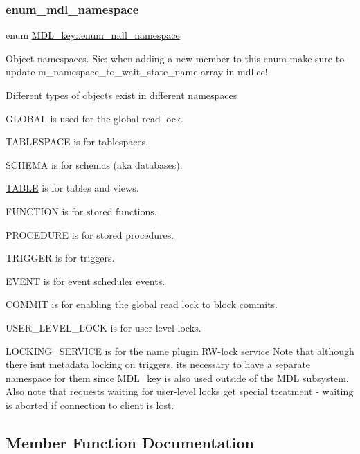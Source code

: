 \subsubsection{\texorpdfstring{enum\+\_\+mdl\+\_\+namespace}{enum\_mdl\_namespace}}
{\footnotesize\ttfamily enum \mbox{\hyperlink{structMDL__key_a391ec4bd98fec6852a48f7856546ed3b}{M\+D\+L\+\_\+key\+::enum\+\_\+mdl\+\_\+namespace}}}

Object namespaces. Sic\+: when adding a new member to this enum make sure to update m\+\_\+namespace\+\_\+to\+\_\+wait\+\_\+state\+\_\+name array in mdl.\+cc!

Different types of objects exist in different namespaces
\begin{DoxyItemize}
\item G\+L\+O\+B\+AL is used for the global read lock.
\item T\+A\+B\+L\+E\+S\+P\+A\+CE is for tablespaces.
\item S\+C\+H\+E\+MA is for schemas (aka databases).
\item \mbox{\hyperlink{structTABLE}{T\+A\+B\+LE}} is for tables and views.
\item F\+U\+N\+C\+T\+I\+ON is for stored functions.
\item P\+R\+O\+C\+E\+D\+U\+RE is for stored procedures.
\item T\+R\+I\+G\+G\+ER is for triggers.
\item E\+V\+E\+NT is for event scheduler events.
\item C\+O\+M\+M\+IT is for enabling the global read lock to block commits.
\item U\+S\+E\+R\+\_\+\+L\+E\+V\+E\+L\+\_\+\+L\+O\+CK is for user-\/level locks.
\item L\+O\+C\+K\+I\+N\+G\+\_\+\+S\+E\+R\+V\+I\+CE is for the name plugin RW-\/lock service Note that although there isn\textquotesingle{}t metadata locking on triggers, it\textquotesingle{}s necessary to have a separate namespace for them since \mbox{\hyperlink{structMDL__key}{M\+D\+L\+\_\+key}} is also used outside of the M\+DL subsystem. Also note that requests waiting for user-\/level locks get special treatment -\/ waiting is aborted if connection to client is lost. 
\end{DoxyItemize}

\subsection{Member Function Documentation}
\mbox{\label{structMDL__key_a0fd5e296b28b81a930cd59df5f23df59}} 
